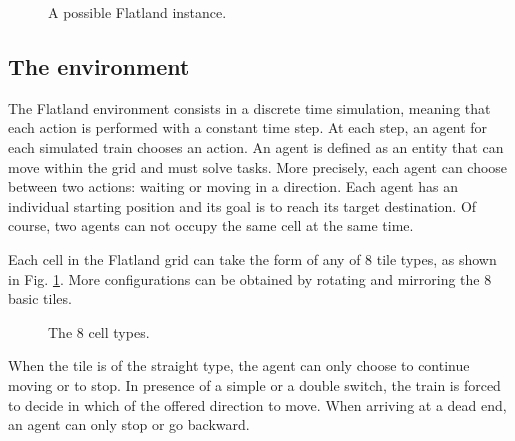 \documentclass[a4paper, 12pt]{article}
\numberwithin{equation}{section}
\begin{document}
\begin{figure}[h]
	\centering
		\caption{A possible Flatland instance.}
\end{figure}

\subsection[The environment]{The environment \cite{flatland-challenge}}

The Flatland environment consists in a discrete time simulation, meaning that each action is performed with a constant time step. At each step, an agent for each simulated train chooses an action. An agent is defined as an entity that can move within the grid and must solve tasks. More precisely, each agent can choose between two actions: waiting or moving in a direction. Each agent has an individual starting position and its goal is to reach its target destination. Of course, two agents can not occupy the same cell at the same time.

Each cell in the Flatland grid can take the form of any of 8 tile types, as shown in Fig. \ref{fig:cell-types}. More configurations can be obtained by rotating and mirroring the 8 basic tiles.

\begin{figure}[h]
	\centering
		\caption{The 8 cell types.}
	\label{fig:cell-types}
\end{figure}

When the tile is of the straight type, the agent can only choose to continue moving or to stop. In presence of a simple or a double switch, the train is forced to decide in which of the offered direction to move. When arriving at a dead end, an agent can only stop or go backward.
\end{document}
